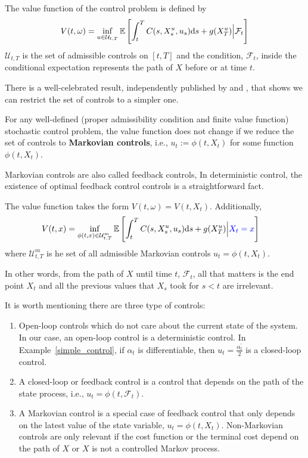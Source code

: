 \documentclass[11pt]{book}
\newcommand{\ds}{\text{\normalfont d}s}
\begin{document}
\begin{defn}
    The value function of the control problem is defined by
\begin{equation}
V(t,\omega)=\inf_{u\in\mathcal{U}_{t,T}}\mathbb{E}\left[\int_{t}^{T}C(s,X_s^u,u_s){{\ds}}+g(X_T^u)\Big|\mathcal{F}_t\right]
\end{equation}
$\mathcal{U}_{t,T}$ is the set of admissible controls on $[t,T]$ and the condition, $\mathcal{F}_t$, inside the conditional expectation represents the path of $X$ before or at time $t$.
\end{defn}
There is a well-celebrated result, independently published by \cite{haussmann1986existence} and \cite{el1987compactification}, that shows we can restrict the set of controls to a simpler one. 
\begin{thm}
    For any well-defined (proper admissibility condition and finite value function) stochastic control problem, the value function does not change if we reduce the set of controls to \textbf{Markovian controls}, i.e., $u_t:=\phi(t,X_t)$ for some function $\phi(t,X_t)$. 
\end{thm}
Markovian controls are also called feedback controls, In deterministic control, the existence of optimal feedback control controls is a straightforward fact. 
\begin{coro}\label{coro:Markov_value_function}
   The value function takes the form $V(t,\omega)= V(t,X_t)$. Additionally, 
\begin{equation}\label{eqn:value_function_omega}
\begin{split}
    V(t,x) &=\inf_{\phi(t,x)\in\mathcal{U}^{m}_{t,T}}\mathbb{E}\left[\int_{t}^{T}C(s,X_s^u,u_s){{\ds}}+g(X_T^u)\Big|{\color{blue}X_t=x}\right]
\end{split}
\end{equation}
where $\mathcal{U}^{m}_{t,T}$ is he set of all admissible Markovian controls $u_t=\phi(t,X_t)$.
\end{coro}
In other words, from the path of $X$ until time $t$, $\mathcal{F}_t$, all that matters is the end point $X_t$ and all the previous values that $X_s$ took for $s<t$ are irrelevant. 

It is worth mentioning there are three type of controls:
\begin{enumerate}
    \item Open-loop controls which do not care about the current state of the system. In our case, an open-loop control is a deterministic control. In Example~\ref{simple_control}, if $\alpha_t$ is differentiable, then $u_t=\frac{\alpha_t^{\prime}}{2}$ is a closed-loop control. 
    \item A closed-loop or feedback control is a control that depends on the path of the state process, i.e., $u_t = \phi(t,\mathcal{F}_{t})$.
    \item A Markovian control is a special case of feedback control that only depends on the latest value of the state variable, $u_t=\phi(t,X_t)$. Non-Markovian controls are only relevant if the cost function or the terminal cost depend on the path of $X$ or $X$ is not a controlled Markov process.
\end{enumerate}
\end{document}
